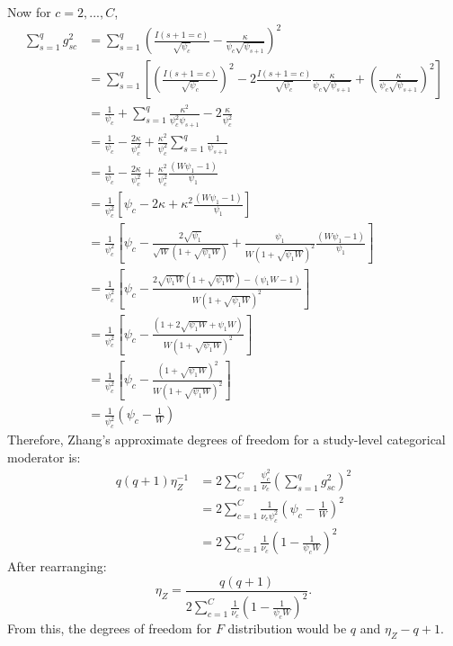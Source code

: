 Now for $c = 2,...,C$, 
\begin{equation}
    \begin{aligned}
\sum_{s=1}^q g_{sc}^2 &= \sum_{s=1}^q \left(\frac{I(s+1 = c)}{\sqrt{\psi_{c}}} - \frac{\kappa}{\psi_c \sqrt{\psi_{s+1}}}\right)^2 \\
&= \sum_{s=1}^q \left[ \left( \frac{I(s+1 = c)}{\sqrt{\psi_c}} \right)^2 - 2 \frac{I(s+1 = c)}{\sqrt{\psi_c}} \frac{\kappa}{\psi_c \sqrt{\psi_{s+1}}} + \left( \frac{\kappa}{\psi_c \sqrt{\psi_{s+1}}} \right)^2 \right] \\
&= \frac{1}{\psi_c} + \sum_{s=1}^q \frac{\kappa^2}{\psi_c^2 \psi_{s+1}} - 2 \frac{\kappa}{\psi_c^2 }\\
&= \frac{1}{\psi_c} - \frac{2 \kappa}{\psi_c^2} + \frac{\kappa^2}{\psi_c^2}\sum_{s=1}^q \frac{1}{\psi_{s+1}} \\
&= \frac{1}{\psi_c} - \frac{2 \kappa}{\psi_c^2} + \frac{\kappa^2}{\psi_c^2}\frac{(W \psi_1 - 1)}{\psi_1} \\
&= \frac{1}{\psi_c^2}\left[\psi_c - 2\kappa + \kappa^2\frac{(W \psi_1 - 1)}{\psi_1}\right] \\
&= \frac{1}{\psi_c^2}\left[\psi_c - \frac{2\sqrt{\psi_1}}{\sqrt{W}(1+\sqrt{\psi_1 W})} + \frac{\psi_1}{W(1+\sqrt{\psi_1 W})^2}\frac{(W \psi_1 - 1)}{\psi_1}\right] \\
&= \frac{1}{\psi_c^2}\left[\psi_c - \frac{2\sqrt{\psi_1 W}(1 + \sqrt{\psi_1 W}) -(\psi_1 W - 1)}{W(1+\sqrt{\psi_1 W})^2}  \right] \\
&= \frac{1}{\psi_c^2}\left[\psi_c - \frac{(1+2\sqrt{\psi_1 W}+\psi_1 W)}{W(1+\sqrt{\psi_1 W})^2}  \right] \\
&= \frac{1}{\psi_c^2}\left[\psi_c - \frac{(1+\sqrt{\psi_1 W})^2}{W(1+\sqrt{\psi_1 W})^2}  \right] \\
&= \frac{1}{\psi_c^2} \left(\psi_c - \frac{1}{W}\right)
\end{aligned}
\nonumber
\end{equation}
Therefore, Zhang's approximate degrees of freedom for a study-level categorical moderator is:
\begin{equation}
    \begin{aligned}
q(q + 1)\eta_Z^{-1} &= 2\sum_{c=1}^C \frac{\psi_c^2}{\nu_c} \left(\sum_{s=1}^q g_{sc}^2\right)^2 \\
&= 2\sum_{c=1}^C \frac{1}{\nu_c \psi_c^2}\left(\psi_c - \frac{1}{W}\right)^2 \\
&= 2\sum_{c=1}^C \frac{1}{\nu_c}\left(1 - \frac{1}{\psi_c W}\right)^2
\end{aligned}
\nonumber
\end{equation}
After rearranging: 
\begin{equation}
    \eta_Z = \frac{q(q + 1)}{2 \sum_{c=1}^C \frac{1}{\nu_c}\left(1 - \frac{1}{\psi_c W}\right)^2}.
    \nonumber
\end{equation}
From this, the degrees of freedom for $F$ distribution would be $q$ and $\eta_Z - q + 1$.

